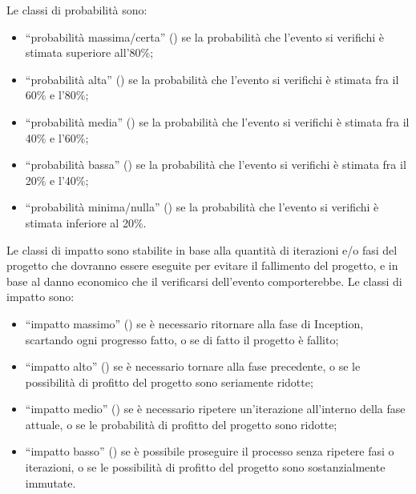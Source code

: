 Le classi di probabilit\`a sono:
\begin{itemize}
	\item ``probabilit\`a massima/certa'' () se la probabilit\`a che l'evento si verifichi \`e stimata superiore all'80\%;
	\item ``probabilit\`a alta'' () se la probabilit\`a che l'evento si verifichi \`e stimata fra il 60\% e l'80\%;
	\item ``probabilit\`a media'' () se la probabilit\`a che l'evento si verifichi \`e stimata fra il 40\% e l'60\%;
	\item ``probabilit\`a bassa'' () se la probabilit\`a che l'evento si verifichi \`e stimata fra il 20\% e l'40\%;
	\item ``probabilit\`a minima/nulla'' () se la probabilit\`a che l'evento si verifichi \`e stimata inferiore al 20\%.
\end{itemize}

Le classi di impatto sono stabilite in base alla quantit\`a di iterazioni e/o fasi del progetto che dovranno essere eseguite per evitare il fallimento del progetto, e in base al danno economico che il verificarsi dell'evento comporterebbe.
Le classi di impatto sono:
\begin{itemize}
	\item ``impatto massimo'' () se \`e necessario ritornare alla fase di Inception, scartando ogni progresso fatto, o se di fatto il progetto \`e fallito;
	\item ``impatto alto'' () se \`e necessario tornare alla fase precedente, o se le possibilit\`a di profitto del progetto sono seriamente ridotte;
	\item ``impatto medio'' () se \`e necessario ripetere un'iterazione all'interno della fase attuale, o se le probabilit\`a di profitto del progetto sono ridotte;
	\item ``impatto basso'' () se \`e possibile proseguire il processo senza ripetere fasi o iterazioni, o se le possibilit\`a di profitto del progetto sono sostanzialmente immutate.
\end{itemize}

